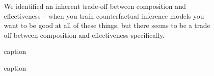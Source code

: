 \documentclass[11pt]{article}
\begin{document}
\begin{figure}[H]
    \centering
    \caption{We identified an inherent trade-off between composition and effectiveness -- when you train counterfactual inference models you want to be good at all of these things, but there seems to be a trade off between composition and effectiveness specifically.}
\end{figure}

\begin{figure}[H]
    \centering
    \caption{caption}
\end{figure}

\begin{figure}[H]
    \centering
    \caption{caption}
\end{figure}
\end{document}
